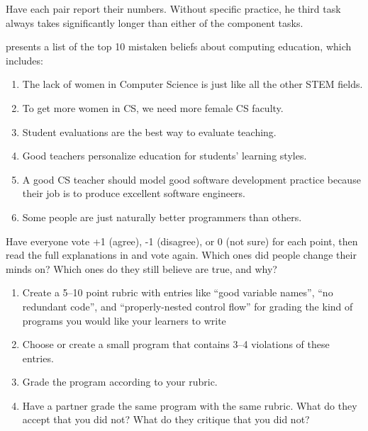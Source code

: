 Have each pair report their numbers.
Without specific practice,
he third task always takes significantly longer than either of the component tasks.


\cite{Guzd2015b} presents a list of the top 10 mistaken beliefs about computing education,
which includes:

\begin{enumerate}
\item
  The lack of women in Computer Science is just like all the other STEM fields.
\item
  To get more women in CS, we need more female CS faculty.
\item
  Student evaluations are the best way to evaluate teaching.
\item
  Good teachers personalize education for students' learning styles.
\item
  A good CS teacher should model good software development practice
  because their job is to produce excellent software engineers.
\item
  Some people are just naturally better programmers than others.
\end{enumerate}

Have everyone vote +1 (agree), -1 (disagree), or 0 (not sure) for each point,
then read the full explanations in
and vote again.
Which ones did people change their minds on?
Which ones do they still believe are true, and why?


\begin{enumerate}

\item
  Create a 5--10 point rubric
  with entries like ``good variable names'', ``no redundant code'', and ``properly-nested control flow''
  for grading the kind of programs you would like your learners to write

\item
  Choose or create a small program that contains 3--4 violations of these entries.

\item
  Grade the program according to your rubric.

\item
  Have a partner grade the same program with the same rubric.
  What do they accept that you did not?
  What do they critique that you did not?

\end{enumerate}
